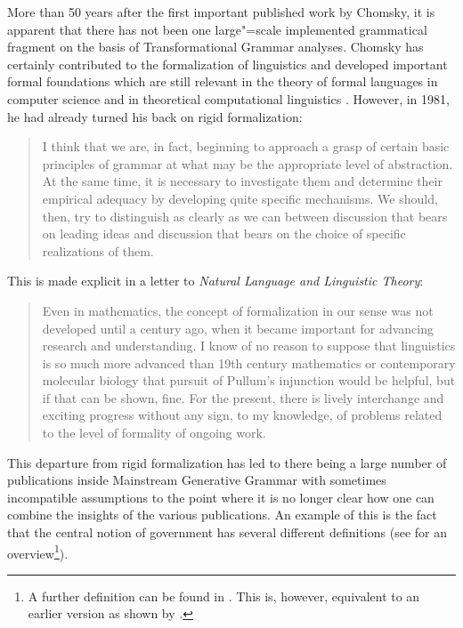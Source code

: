 More than 50 years after the first important published work by Chomsky, it is apparent that there has not been
one large"=scale implemented grammatical fragment on the basis of Transformational Grammar analyses. Chomsky
has certainly contributed to the formalization of linguistics and developed important formal foundations which
are still relevant in the theory of formal languages in computer science and
in theoretical computational linguistics \citep{Chomsky59a-u}. However, in 1981, he had already turned his back on rigid
formalization:
\begin{quote}
I think that we are, in fact, beginning to approach a grasp of certain 
basic principles of grammar at what may be the appropriate level of abstraction. At the same time, 
it is necessary to investigate them and determine their empirical adequacy by developing quite specific mechanisms.
We should, then, try to distinguish as clearly as we can between discussion that bears on leading ideas and
discussion that bears on the choice of specific realizations of them. \citep*[--3]{Chomsky81a}
\end{quote}
This is made explicit in a letter to \emph{Natural Language and Linguistic Theory}:
\begin{quote}
Even in mathematics, the concept of formalization in our sense was not
developed until a century ago, when it became important for advancing research
and understanding. I know of no reason to suppose that linguistics is so much
more advanced than 19th century mathematics or contemporary molecular
biology that pursuit of Pullum's injunction would be helpful, but if that can be
shown, fine. For the present, there is lively interchange and exciting progress
without any sign, to my knowledge, of problems related to the level of formality
of ongoing work. \citep[]{Chomsky90a}
\end{quote}
This departure from rigid formalization has led to there being a large number of publications inside
Mainstream Generative Grammar with sometimes incompatible assumptions to the point where it is no longer clear
how one can combine the insights of the various publications. 
An example of this is the fact that the central notion of government has several different definitions
(see \citealp{AS83a} for an overview\footnote{%
A further definition can be found in . This is, however, equivalent to an earlier version as shown
by \citet[--106]{PP86a}.%
}).

